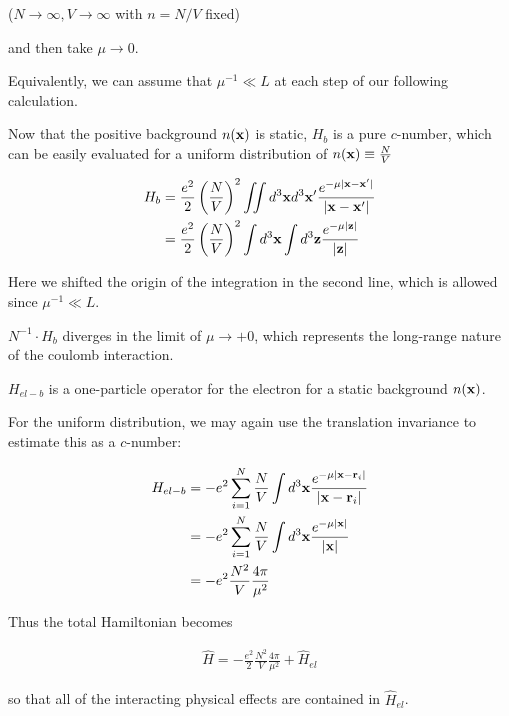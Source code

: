 ($N\rightarrow\infty, V\rightarrow\infty$ with $n = N/V$ fixed)

and then take $\mu\rightarrow0$. 

Equivalently, we can assume that $\mu^{-1}\ll L$ at each step of our following calculation. 

Now that the positive background $n(\bf x)$ is static, $H_b$ is a pure $c$-number, which can be easily evaluated for a uniform distribution of $n({\bf x})\equiv\frac{N}{V}$

\begin{align}
\begin{split}
H_b &=\frac{e^2}{2}\left(\frac{N}{V}\right)^2\iint d^3{\bf x}d^3{\bf x'}\frac{e^{-\mu|\bf x-x'|}}{|\bf x-x'|}\\
&=\frac{e^2}{2}\left(\frac{N}{V}\right)^2\int d^3{\bf x}\int d^3{\bf z}\frac{e^{-\mu|\bf z|}}{|\bf z|}
\end{split}
\end{align}%

Here we shifted the origin of the integration in the second line, which is allowed since $\mu^{-1}\ll L$. 

$N^{-1}\cdot H_b$ diverges in the limit of $\mu\to +0$, which represents the long-range nature of the coulomb interaction. 

$H_{el-b}$ is a one-particle operator for the electron for a static background $n({\bf x})$. 

For the uniform distribution, we may again use the translation invariance to estimate this as a $c$-number:

\begin{align}
\begin{split}
H_{el-b}&=-e^2\sum_{i=1}^N\frac{N}{V}\int d^3{\bf x}\frac{e^{-\mu|{\bf x-r}_i|}}{|{\bf x-r}_i|}\\
&=-e^2\sum_{i=1}^N\frac{N}{V}\int d^3{\bf x}\frac{e^{-\mu|{\bf x}|}}{|{\bf x}|}\\
&=-e^2\frac{N^2}{V}\frac{4\pi}{\mu^2}
\end{split}
\end{align}

Thus the total Hamiltonian becomes 

\begin{align}\label{eq1.8.10}
\hat{H}=-\frac{e^2}{2}\frac{N^2}{V}\frac{4\pi}{\mu^2}+\hat{H}_{el}
\end{align}

so that all of the interacting physical effects are contained in $\hat{H}_{el}$. 


